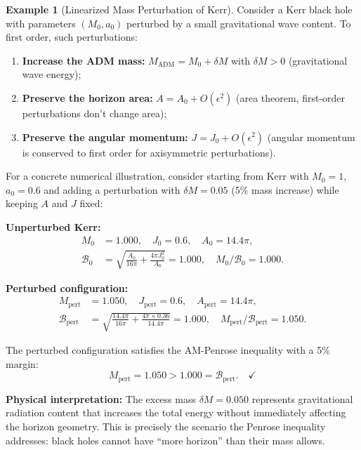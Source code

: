 \documentclass[12pt]{article}
\theoremstyle{plain}
\theoremstyle{definition}
\newtheorem{example}[theorem]{Example}
\theoremstyle{remark}
\newcommand{\ADM}{\mathrm{ADM}}
\begin{document}
\begin{example}[Linearized Mass Perturbation of Kerr]\label{ex:perturbed-kerr}
Consider a Kerr black hole with parameters $(M_0, a_0)$ perturbed by a small gravitational wave content. To first order, such perturbations:
\begin{enumerate}[label=(\roman*)]
    \item \textbf{Increase the ADM mass:} $M_{\ADM} = M_0 + \delta M$ with $\delta M > 0$ (gravitational wave energy);
    \item \textbf{Preserve the horizon area:} $A = A_0 + O(\epsilon^2)$ (area theorem, first-order perturbations don't change area);
    \item \textbf{Preserve the angular momentum:} $J = J_0 + O(\epsilon^2)$ (angular momentum is conserved to first order for axisymmetric perturbations).
\end{enumerate}

For a concrete numerical illustration, consider starting from Kerr with $M_0 = 1$, $a_0 = 0.6$ and adding a perturbation with $\delta M = 0.05$ (5\% mass increase) while keeping $A$ and $J$ fixed:

\textbf{Unperturbed Kerr:}
\begin{align*}
M_0 &= 1.000, \quad J_0 = 0.6, \quad A_0 = 14.4\pi, \\
\mathcal{B}_0 &= \sqrt{\frac{A_0}{16\pi} + \frac{4\pi J_0^2}{A_0}} = 1.000, \quad M_0/\mathcal{B}_0 = 1.000.
\end{align*}

\textbf{Perturbed configuration:}
\begin{align*}
M_{\text{pert}} &= 1.050, \quad J_{\text{pert}} = 0.6, \quad A_{\text{pert}} = 14.4\pi, \\
\mathcal{B}_{\text{pert}} &= \sqrt{\frac{14.4\pi}{16\pi} + \frac{4\pi \times 0.36}{14.4\pi}} = 1.000, \quad M_{\text{pert}}/\mathcal{B}_{\text{pert}} = 1.050.
\end{align*}

The perturbed configuration satisfies the AM-Penrose inequality with a 5\% margin:
\[
M_{\text{pert}} = 1.050 > 1.000 = \mathcal{B}_{\text{pert}}. \quad \checkmark
\]

\textbf{Physical interpretation:} The excess mass $\delta M = 0.050$ represents gravitational radiation content that increases the total energy without immediately affecting the horizon geometry. This is precisely the scenario the Penrose inequality addresses: black holes cannot have ``more horizon'' than their mass allows.
\end{example}
\end{document}
